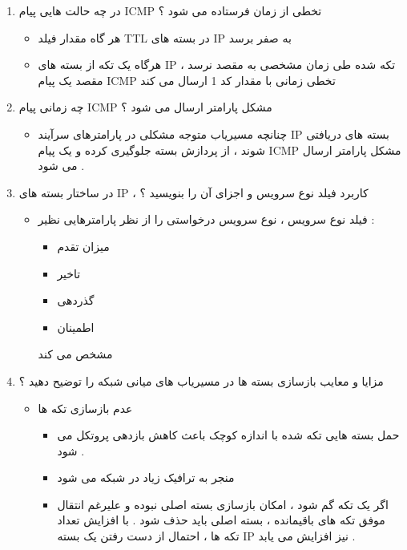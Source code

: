 \documentclass{article}
\begin{document}
\begin{enumerate}
\item در چه حالت هایی پیام ICMP تخطی از زمان فرستاده می شود ؟

\begin{tcolorbox}
\begin{itemize}
	\item هر گاه مقدار فیلد TTL در بسته های IP به صفر برسد 
	\item هرگاه یک تکه از بسته های IP
	 تکه شده طی زمان مشخصی به مقصد   نرسد ،
 مقصد یک پیام
	 ICMP تخطی زمانی 
	با مقدار کد 1 ارسال می کند
\end{itemize}
\end{tcolorbox}

\item چه زمانی پیام ICMP مشکل پارامتر ارسال می شود ؟

\begin{tcolorbox}
\begin{itemize}
	\item چنانچه مسیریاب متوجه مشکلی در پارامترهای سرآیند IP بسته های دریافتی شوند ،
	از پردازش بسته جلوگیری کرده و یک پیام ICMP 
	مشکل پارامتر ارسال می شود .
\end{itemize}
\end{tcolorbox}

\item در ساختار بسته های IP ، کاربرد فیلد نوع سرویس و اجزای آن را بنویسید ؟

\begin{tcolorbox}
\begin{itemize}
	\item فیلد نوع سرویس ، نوع سرویس درخواستی را از نظر پارامترهایی نظیر : 
	\begin{itemize}
		\item میزان تقدم
		\item تاخیر
		\item گذردهی
		\item اطمینان
	\end{itemize}
	  مشخص می کند
\end{itemize}
\end{tcolorbox}


\newpage

\item مزایا و معایب بازسازی بسته ها در مسیریاب های میانی شبکه را توضیح دهید ؟

\begin{tcolorbox}
\begin{itemize}
	\item عدم بازسازی تکه ها
	\begin{itemize}
		\item حمل بسته هایی تکه شده با اندازه کوچک باعث کاهش بازدهی پروتکل می شود .
		\item منجر به ترافیک زیاد در شبکه می شود 
		\item اگر یک تکه گم شود ، امکان بازسازی بسته اصلی نبوده و علیرغم انتقال موفق تکه های باقیمانده ، بسته اصلی باید حذف شود . با افزایش تعداد تکه ها ، احتمال از دست رفتن یک بسته IP نیز افزایش می یابد .
	\end{itemize}


\end{itemize}
\end{tcolorbox}
\end{enumerate}
\end{document}
